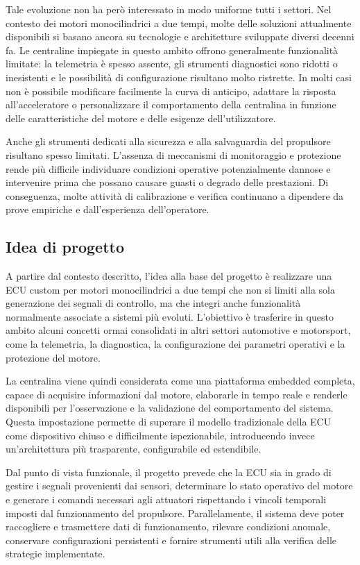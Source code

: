 \documentclass{article}
\begin{document}
Tale evoluzione non ha però interessato in modo uniforme tutti i settori. Nel contesto dei motori monocilindrici a due tempi, molte delle soluzioni attualmente disponibili si basano ancora su tecnologie e architetture sviluppate diversi decenni fa. Le centraline impiegate in questo ambito offrono generalmente funzionalità limitate: la telemetria è spesso assente, gli strumenti diagnostici sono ridotti o inesistenti e le possibilità di configurazione risultano molto ristrette. In molti casi non è possibile modificare facilmente la curva di anticipo, adattare la risposta all'acceleratore o personalizzare il comportamento della centralina in funzione delle caratteristiche del motore e delle esigenze dell'utilizzatore.

Anche gli strumenti dedicati alla sicurezza e alla salvaguardia del propulsore risultano spesso limitati. L'assenza di meccanismi di monitoraggio e protezione rende più difficile individuare condizioni operative potenzialmente dannose e intervenire prima che possano causare guasti o degrado delle prestazioni. Di conseguenza, molte attività di calibrazione e verifica continuano a dipendere da prove empiriche e dall'esperienza dell'operatore.

\subsection{Idea di progetto}

A partire dal contesto descritto, l'idea alla base del progetto è realizzare una ECU custom per motori monocilindrici a due tempi che non si limiti alla sola generazione dei segnali di controllo, ma che integri anche funzionalità normalmente associate a sistemi più evoluti. L'obiettivo è trasferire in questo ambito alcuni concetti ormai consolidati in altri settori automotive e motorsport, come la telemetria, la diagnostica, la configurazione dei parametri operativi e la protezione del motore.

La centralina viene quindi considerata come una piattaforma embedded completa, capace di acquisire informazioni dal motore, elaborarle in tempo reale e renderle disponibili per l'osservazione e la validazione del comportamento del sistema. Questa impostazione permette di superare il modello tradizionale della ECU come dispositivo chiuso e difficilmente ispezionabile, introducendo invece un'architettura più trasparente, configurabile ed estendibile.

Dal punto di vista funzionale, il progetto prevede che la ECU sia in grado di gestire i segnali provenienti dai sensori, determinare lo stato operativo del motore e generare i comandi necessari agli attuatori rispettando i vincoli temporali imposti dal funzionamento del propulsore. Parallelamente, il sistema deve poter raccogliere e trasmettere dati di funzionamento, rilevare condizioni anomale, conservare configurazioni persistenti e fornire strumenti utili alla verifica delle strategie implementate.
\end{document}
